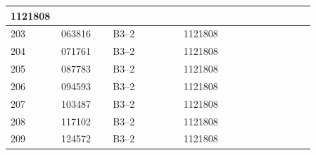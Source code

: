 \documentclass[UTF8,10pt,a4paper,fontset=fandol]{ctexart}
\newcommand{\fieldvalue}[1]{#1}
\begin{document}
\begin{tabular}{|p{0.07\linewidth}|p{0.16\linewidth}|p{0.22\linewidth}|p{0.23\linewidth}|p{0.18\linewidth}|}
\fieldvalue{1121808} & \\
\hline
\fieldvalue{203} &
\fieldvalue{063816} &
\fieldvalue{B3--2} &
\fieldvalue{1121808} & \\
\hline
\fieldvalue{204} &
\fieldvalue{071761} &
\fieldvalue{B3--2} &
\fieldvalue{1121808} & \\
\hline
\fieldvalue{205} &
\fieldvalue{087783} &
\fieldvalue{B3--2} &
\fieldvalue{1121808} & \\
\hline
\fieldvalue{206} &
\fieldvalue{094593} &
\fieldvalue{B3--2} &
\fieldvalue{1121808} & \\
\hline
\fieldvalue{207} &
\fieldvalue{103487} &
\fieldvalue{B3--2} &
\fieldvalue{1121808} & \\
\hline
\fieldvalue{208} &
\fieldvalue{117102} &
\fieldvalue{B3--2} &
\fieldvalue{1121808} & \\
\hline
\fieldvalue{209} &
\fieldvalue{124572} &
\fieldvalue{B3--2} &
\fieldvalue{1121808} & \\
\hline
\end{tabular}
\end{document}
